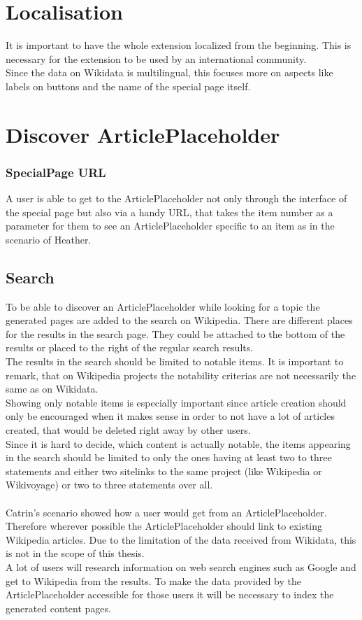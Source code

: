 \section{Localisation}
It is important to have the whole extension localized from the beginning. This is necessary for the extension to be used by an international community. \\ Since the data on Wikidata is multilingual, this focuses more on aspects like labels on buttons and the name of the special page itself.

\section{Discover ArticlePlaceholder}
\subsubsection{SpecialPage URL}
A user is able to get to the ArticlePlaceholder not only through the interface of the special page but also via a handy URL, that takes the item number as a parameter for them to see an ArticlePlaceholder specific to an item as in the scenario of Heather.

\subsection{Search}
To be able to discover an ArticlePlaceholder while looking for a topic the generated pages are added to the search on Wikipedia. There are different places for the results in the search page. They could be attached to the bottom of the results or placed to the right of the regular search results. \\
The results in the search should be limited to notable items. It is important to remark, that on Wikipedia projects the notability criterias are not necessarily the same as on Wikidata. \\
Showing only notable items is especially important since article creation should only be encouraged when it makes sense in order to not have a lot of articles created, that would be deleted right away by other users. \\
Since it is hard to decide, which content is actually notable, the items appearing in the search should be limited to only the ones having at least two to three statements and either two sitelinks to the same project (like Wikipedia or Wikivoyage) or two to three statements over all. \\
\\
Catrin's scenario showed how a user would get from an ArticlePlaceholder. Therefore wherever possible the ArticlePlaceholder should link to existing Wikipedia articles. Due to the limitation of the data received from Wikidata, this is not in the scope of this thesis.
\\
A lot of users will research information on web search engines such as Google and get to Wikipedia from the results. To make the data provided by the ArticlePlaceholder accessible for those users it will be necessary to index the generated content pages. 

